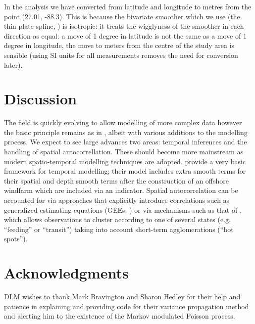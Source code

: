 \documentclass[a4paper,12pt]{article}
\begin{document}
%

In the analysis we have converted from latitude and longitude to metres from the point (27.01, -88.3). This is because the bivariate smoother which we use (the thin plate spline, \cite{Wood:2003tc}) is isotropic: it treats the wigglyness of the smoother in each direction as equal: a move of 1 degree in latitude is not the same as a move of 1 degree in longitude, the move to meters from the centre of the study area is sensible (using SI units for all measurements removes the need for conversion later).

\section*{Discussion}
\label{s:discussion}

The field is quickly evolving to allow modelling of more complex data however the basic principle remains as in \cite{Hedley:2004et}, albeit with various additions to the modelling process. We expect to see large advances two areas: temporal inferences and the handling of spatial autocorrellation. These should become more mainstream as modern spatio-temporal modelling techniques are adopted. \cite{Petersen:2011vy} provide a very basic framework for temporal modelling; their model includes extra smooth terms for their spatial and depth smooth terms after the construction of an offshore windfarm which are included via an indicator. Spatial autocorrelation can be accounted for via approaches that explicitly introduce correlations such as generalized estimating equations (GEEs; \cite{Hardin:2003uf}) or via mechanisms such as that of \cite{Skaug:2006gs}, which allows observations to cluster according to one of several states (e.g. ``feeding'' or ``transit'') taking into account short-term agglomerations (``hot spots'').



\section*{Acknowledgments}

DLM wishes to thank Mark Bravington and Sharon Hedley for their help and patience in explaining and providing code for their variance propagation method and alerting him to the existence of the Markov modulated Poisson process.
\end{document}
